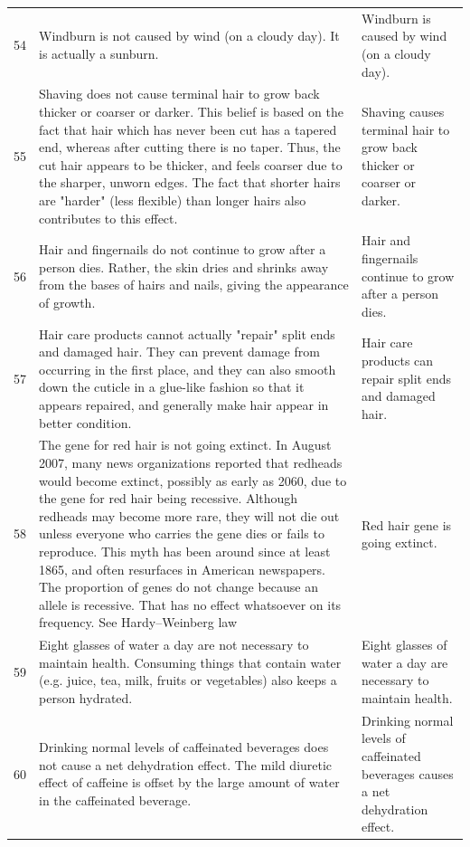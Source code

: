\begin{tabular}{c|p{}|p{}}
54 & Windburn is not caused by wind (on a cloudy day). It is actually a sunburn. & Windburn is caused by wind (on a cloudy day). \\
55 & Shaving does not cause terminal hair to grow back thicker or coarser or darker. This belief is based on the fact that hair which has never been cut has a tapered end, whereas after cutting there is no taper. Thus, the cut hair appears to be thicker, and feels coarser due to the sharper, unworn edges. The fact that shorter hairs are "harder" (less flexible) than longer hairs also contributes to this effect. & Shaving causes terminal hair to grow back thicker or coarser or darker. \\
56 & Hair and fingernails do not continue to grow after a person dies. Rather, the skin dries and shrinks away from the bases of hairs and nails, giving the appearance of growth. & Hair and fingernails continue to grow after a person dies. \\
57 & Hair care products cannot actually "repair" split ends and damaged hair. They can prevent damage from occurring in the first place, and they can also smooth down the cuticle in a glue-like fashion so that it appears repaired, and generally make hair appear in better condition. & Hair care products can repair split ends and damaged hair. \\
58 & The gene for red hair is not going extinct. In August 2007, many news organizations reported that redheads would become extinct, possibly as early as 2060, due to the gene for red hair being recessive. Although redheads may become more rare, they will not die out unless everyone who carries the gene dies or fails to reproduce. This myth has been around since at least 1865, and often resurfaces in American newspapers. The proportion of genes do not change because an allele is recessive. That has no effect whatsoever on its frequency. See Hardy–Weinberg law & Red hair gene is going extinct. \\
59 & Eight glasses of water a day are not necessary to maintain health. Consuming things that contain water (e.g. juice, tea, milk, fruits or vegetables) also keeps a person hydrated. & Eight glasses of water a day are necessary to maintain health. \\
60 & Drinking normal levels of caffeinated beverages does not cause a net dehydration effect. The mild diuretic effect of caffeine is offset by the large amount of water in the caffeinated beverage. & Drinking normal levels of caffeinated beverages causes a net dehydration effect. \\

\end{tabular}
